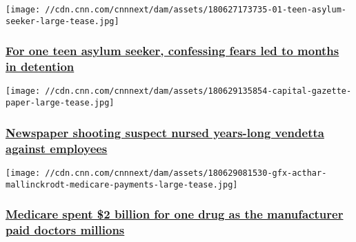 \texttt{[image: //cdn.cnn.com/cnnnext/dam/assets/180627173735-01-teen-asylum-seeker-large-tease.jpg]}

\hypertarget{for-one-teen-asylum-seeker-confessing-fears-led-to-months-in-detention}{%
\subsubsection{\texorpdfstring{\href{/2018/06/29/us/teenage-asylum-seeker-migrant-describes-months-in-detention-invs/index.html}{For
one teen asylum seeker, confessing fears led to months in
detention}}{For one teen asylum seeker, confessing fears led to months in detention}}\label{for-one-teen-asylum-seeker-confessing-fears-led-to-months-in-detention}}

\href{/2018/06/29/us/annapolis-capital-gazette-newspaper-shooting-suspect-long-vendetta-invs/index.html}{}

\texttt{[image: //cdn.cnn.com/cnnnext/dam/assets/180629135854-capital-gazette-paper-large-tease.jpg]}

\hypertarget{newspaper-shooting-suspect-nursed-years-long-vendetta-against-employees}{%
\subsubsection{\texorpdfstring{\href{/2018/06/29/us/annapolis-capital-gazette-newspaper-shooting-suspect-long-vendetta-invs/index.html}{Newspaper
shooting suspect nursed years-long vendetta against
employees}}{Newspaper shooting suspect nursed years-long vendetta against employees}}\label{newspaper-shooting-suspect-nursed-years-long-vendetta-against-employees}}

\href{/2018/06/29/health/acthar-mallinckrodt-medicare-claims-doctor-payments/index.html}{}

\texttt{[image: //cdn.cnn.com/cnnnext/dam/assets/180629081530-gfx-acthar-mallinckrodt-medicare-payments-large-tease.jpg]}

\hypertarget{medicare-spent-2-billion-for-one-drug-as-the-manufacturer-paid-doctors-millions}{%
\subsubsection{\texorpdfstring{\href{/2018/06/29/health/acthar-mallinckrodt-medicare-claims-doctor-payments/index.html}{Medicare
spent \$2 billion for one drug as the manufacturer paid doctors
millions}}{Medicare spent \$2 billion for one drug as the manufacturer paid doctors millions}}\label{medicare-spent-2-billion-for-one-drug-as-the-manufacturer-paid-doctors-millions}}

